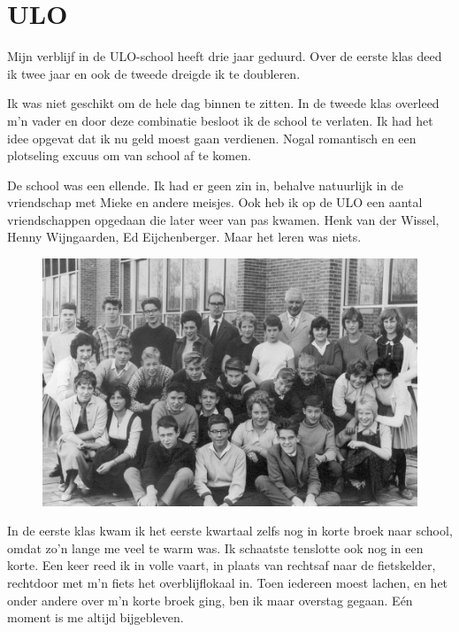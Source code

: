 \documentclass[10pt,twoside, openright]{memoir}
\begin{document}
\chapter{ULO} %
\label{cha:ulo}

Mijn verblijf in de ULO-school heeft drie jaar geduurd. Over de eerste klas deed ik twee jaar en ook de tweede dreigde ik te doubleren. 

Ik was niet geschikt om de hele dag binnen te zitten. In de tweede klas overleed m’n vader en door deze combinatie besloot ik de school te verlaten. Ik had het idee opgevat dat ik nu geld moest gaan verdienen. Nogal romantisch en een plotseling excuus om van school af te komen.  

De school was een ellende. Ik had er geen zin in, behalve natuurlijk in de vriendschap met Mieke en andere meisjes. Ook heb ik op de ULO een aantal vriendschappen opgedaan die later weer van pas kwamen. Henk van der Wissel, Henny Wijngaarden, Ed Eijchenberger. Maar het leren was niets. 

\begin{figure}
\includegraphics[width=\textwidth]{img/ch19/ULOSchool}
\end{figure}

In de eerste klas kwam ik het eerste kwartaal zelfs nog in korte broek naar school, omdat zo’n lange me veel te warm was. Ik schaatste tenslotte ook nog in een korte. Een keer reed ik in volle vaart, in plaats van rechtsaf naar de fietskelder, rechtdoor met m’n fiets het overblijflokaal in. Toen iedereen moest lachen, en het onder andere over m’n korte broek ging, ben ik maar overstag gegaan. Eén moment is me altijd bijgebleven. 
\end{document}
